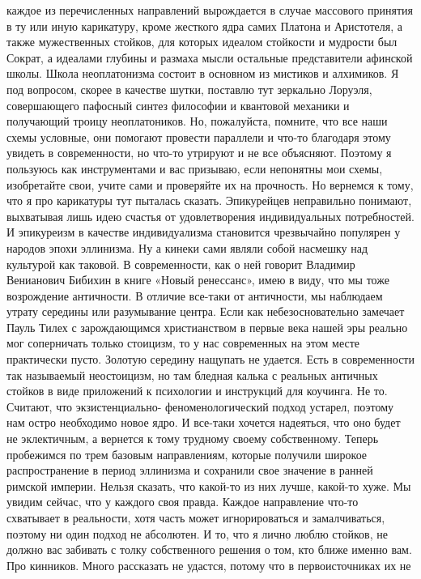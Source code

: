 каждое из перечисленных направлений вырождается в случае массового принятия в ту
или иную карикатуру, кроме жесткого ядра самих Платона и Аристотеля, а также
мужественных стойков, для которых идеалом стойкости и мудрости был Сократ, а
идеалами глубины и размаха мысли остальные представители афинской школы. Школа
неоплатонизма состоит в основном из мистиков и алхимиков. Я под вопросом, скорее
в качестве шутки, поставлю тут зеркально Лоруэля, совершающего пафосный синтез
философии и квантовой механики и получающий троицу неоплатоников. Но,
пожалуйста, помните, что все наши схемы условные, они помогают провести
параллели и что-то благодаря этому увидеть в современности, но что-то утрируют и
не все объясняют. Поэтому я пользуюсь как инструментами и вас призываю, если
непонятны мои схемы, изобретайте свои, учите сами и проверяйте их на прочность.
Но вернемся к тому, что я про карикатуры тут пыталась сказать. Эпикурейцев
неправильно понимают, выхватывая лишь идею счастья от удовлетворения
индивидуальных потребностей. И эпикуреизм в качестве индивидуализма становится
чрезвычайно популярен у народов эпохи эллинизма. Ну а кинеки сами являли собой
насмешку над культурой как таковой. В современности, как о ней говорит Владимир
Венианович Бибихин в книге «Новый ренессанс», имею в виду, что мы тоже
возрождение античности. В отличие все-таки от античности, мы наблюдаем утрату
середины или разумывание центра. Если как небезосновательно замечает Пауль Тилех
с зарождающимся христианством в первые века нашей эры реально мог соперничать
только стоицизм, то у нас современных на этом месте практически пусто. Золотую
середину нащупать не удается. Есть в современности так называемый неостоицизм,
но там бледная калька с реальных античных стойков в виде приложений к психологии
и инструкций для коучинга. Не то. Считают, что экзистенциально-
феноменологический подход устарел, поэтому нам остро необходимо новое ядро. И
все-таки хочется надеяться, что оно будет не эклектичным, а вернется к тому
трудному своему собственному. Теперь пробежимся по трем базовым направлениям,
которые получили широкое распространение в период эллинизма и сохранили свое
значение в ранней римской империи. Нельзя сказать, что какой-то из них лучше,
какой-то хуже. Мы увидим сейчас, что у каждого своя правда. Каждое направление
что-то схватывает в реальности, хотя часть может игнорироваться и замалчиваться,
поэтому ни один подход не абсолютен. И то, что я лично люблю стойков, не должно
вас забивать с толку собственного решения о том, кто ближе именно вам. Про
кинников. Много рассказать не удастся, потому что в первоисточниках их не
